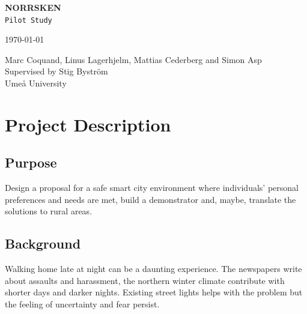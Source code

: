 \documentclass[twoside]{report}
\begin{document}
\begin{titlepage}
	\raggedright
  {\Large{\colorbox{front}{\color{white} \textbf{NORRSKEN}\kern 1pc}}\\\vspace{0.3cm}}
  {\texttt{Pilot Study}\\}
  \vfill
	{\large \today\par}
  {\small\color{gray} Marc Coquand, Linus Lagerhjelm, Mattias Cederberg and Simon
  Asp\\}
  {\small\color{gray} Supervised by Stig Byström}\\
  {\small\color{gray} Umeå University\\}


\end{titlepage}

\newpage
\pagecolor{front}\afterpage{\nopagecolor}\thispagestyle{empty}

 \newpage

\tableofcontents
\thispagestyle{empty}
\newpage

\section{Project Description}
\subsection{Purpose}
Design a proposal for a safe smart city environment where individuals’ personal
preferences and needs are met, build a demonstrator and, maybe, translate the
solutions to rural areas.
\subsection{Background}
Walking home late at night can be a daunting experience. The newspapers write
about assaults and harassment, the northern winter climate contribute with
shorter days and darker nights. Existing street lights helps with the problem
but the feeling of uncertainty and fear persist.
\end{document}
